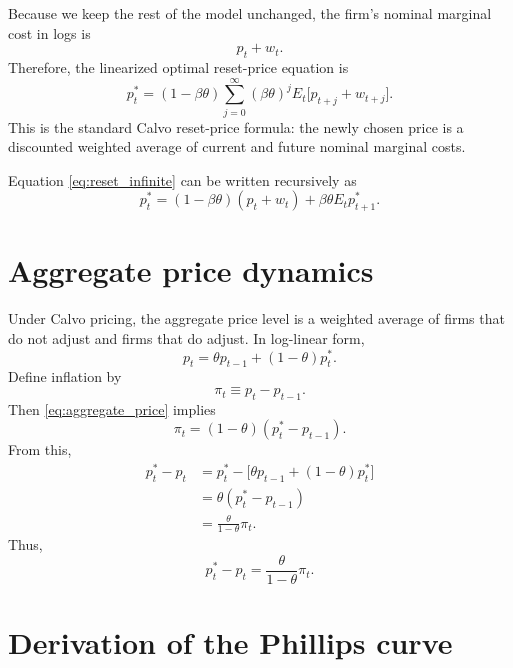 \documentclass[11pt]{article}
\begin{document}
Because we keep the rest of the model unchanged, the firm's nominal marginal cost in logs is
\begin{equation}
p_t + w_t.
\end{equation}
Therefore, the linearized optimal reset-price equation is
\begin{equation}
p_t^* = (1-\beta\theta)\sum_{j=0}^{\infty} (\beta\theta)^j E_t\bigl[p_{t+j}+w_{t+j}\bigr].
\label{eq:reset_infinite}
\end{equation}
This is the standard Calvo reset-price formula: the newly chosen price is a discounted weighted
average of current and future nominal marginal costs.

Equation \eqref{eq:reset_infinite} can be written recursively as
\begin{equation}
p_t^* = (1-\beta\theta)(p_t+w_t) + \beta\theta E_t p_{t+1}^*.
\label{eq:reset_recursive}
\end{equation}

\section{Aggregate price dynamics}

Under Calvo pricing, the aggregate price level is a weighted average of firms that do not adjust
and firms that do adjust. In log-linear form,
\begin{equation}
p_t = \theta p_{t-1} + (1-\theta)p_t^*.
\label{eq:aggregate_price}
\end{equation}
Define inflation by
\begin{equation}
\pi_t \equiv p_t - p_{t-1}.
\end{equation}
Then \eqref{eq:aggregate_price} implies
\begin{equation}
\pi_t = (1-\theta)(p_t^* - p_{t-1}).
\label{eq:inflation_reset_gap}
\end{equation}
From this,
\begin{align}
p_t^* - p_t
&= p_t^* - \bigl[\theta p_{t-1} + (1-\theta)p_t^*\bigr] \\
&= \theta(p_t^* - p_{t-1}) \\
&= \frac{\theta}{1-\theta}\pi_t.
\end{align}
Thus,
\begin{equation}
p_t^* - p_t = \frac{\theta}{1-\theta}\pi_t.
\label{eq:gap_pi}
\end{equation}

\section{Derivation of the Phillips curve}
\end{document}
